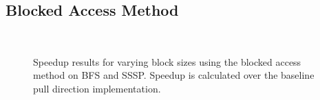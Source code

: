 \subsection{Blocked Access Method}


\begin{figure}[h]
    \centering
     \\
    \caption{Speedup results for varying block sizes using the blocked access method on BFS and SSSP. Speedup is calculated over the baseline pull direction implementation.}
    \label{pap:generals:sec:eval:fig:block}
\end{figure}
 
